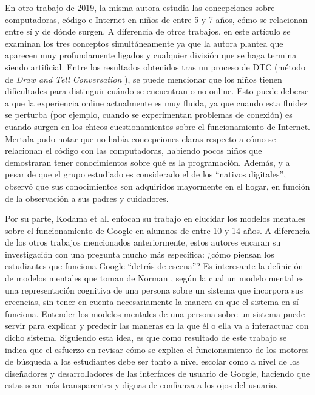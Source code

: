 En otro trabajo de 2019, la misma autora estudia las concepciones sobre computadoras, código e Internet en niños de entre 5 y 7 años, cómo se relacionan entre sí y de dónde surgen. A diferencia de otros trabajos, en este artículo \cite{mertala-2} se examinan los tres conceptos simultáneamente ya que la autora plantea que aparecen muy profundamente ligados y cualquier división que se haga termina siendo artificial. Entre los resultados obtenidos tras un proceso de DTC (método de \textit{Draw and Tell Conversation} \cite{driessnack}), se puede mencionar que los niños tienen dificultades para distinguir cuándo se encuentran o no online. Esto puede deberse a que la experiencia online actualmente es muy fluida, ya que cuando esta fluidez se perturba (por ejemplo, cuando se experimentan problemas de conexión) es cuando surgen en los chicos cuestionamientos sobre el funcionamiento de Internet. Mertala pudo notar que no había concepciones claras respecto a cómo se relacionan el código con las computadoras, habiendo pocos niños que demostraran tener conocimientos sobre qué es la programación. Además, y a pesar de que el grupo estudiado es considerado el de los “nativos digitales”, observó que sus conocimientos son adquiridos mayormente en el hogar, en función de la observación a sus padres y cuidadores.

Por su parte, Kodama et al. \cite{kodama} enfocan su trabajo en elucidar los modelos mentales sobre el funcionamiento de Google en alumnos de entre 10 y 14 años. A diferencia de los otros trabajos mencionados anteriormente, estos autores encaran su investigación con una pregunta mucho más específica: ¿cómo piensan los estudiantes que funciona Google “detrás de escena”? Es interesante la definición de modelos mentales que toman de  Norman \cite{norman}, según la cual un modelo mental es una representación cognitiva de una persona sobre un sistema que incorpora sus creencias, sin tener en cuenta necesariamente la manera en que el sistema en sí funciona. Entender los modelos mentales de una persona sobre un sistema puede servir para explicar y predecir las maneras en la que él o ella va a interactuar con dicho sistema. Siguiendo esta idea, es que como resultado de este trabajo se indica que el esfuerzo en revisar cómo se explica el funcionamiento de los motores de búsqueda a los estudiantes debe ser tanto a nivel escolar como a nivel de los diseñadores y desarrolladores de las interfaces de usuario de Google, haciendo que estas sean más transparentes y dignas de confianza a los ojos del usuario.

